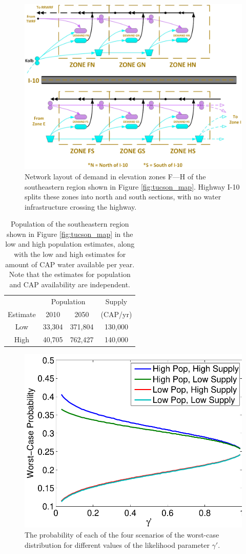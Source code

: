 \documentclass[12pt]{amsart}
\begin{document}
\begin{figure}[!ht]
	\centering
	\includegraphics[width=.8\textwidth]{images/zones_split}
	\caption{
		Network layout of demand in elevation zones F---H of the southeastern region shown in Figure \ref{fig:tucson_map}.
		Highway I-10 splits these zones into north and south sections, with no water infrastructure crossing the highway.
	}
	\label{fig:zones_split}
\end{figure}

\begin{table}[~ht]
	\centering
	\begin{tabular}{|c|cc||c|}
		\hline
		& \multicolumn{2}{|c||}{Population} & Supply \\
		Estimate & 2010 & 2050 & (CAP/yr) \\
		\hline
		\hline
		Low  & 33,304 & 371,804 & 130,000 \\
		\hline
		High & 40,705 & 762,427 & 140,000 \\
		\hline
	\end{tabular}
	\caption{
		Population of the southeastern region shown in Figure \ref{fig:tucson_map} in the low and high population estimates, along with the low and high estimates for amount of CAP water available per year.
		Note that the estimates for population and CAP availability are independent.
	}
	\label{tab:scenario_description}
\end{table}

\begin{figure}[!ht]
	\centering
	\includegraphics[width=.7\textwidth]{images/worst_case_probability}
	\caption{
		The probability of each of the four scenarios of the worst-case distribution for different values of the likelihood parameter $\gamma'$.
	}
	\label{fig:worst_case}
\end{figure}
\end{document}
